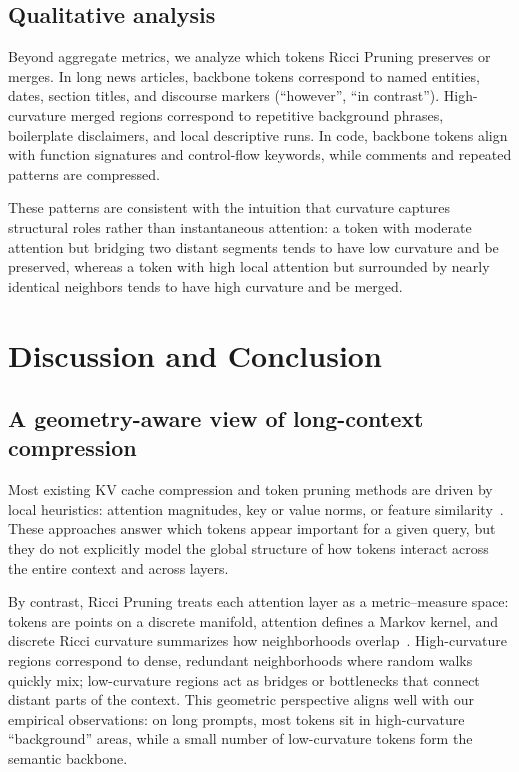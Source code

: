 \documentclass{article}
\theoremstyle{plain}
\theoremstyle{definition}
\theoremstyle{remark}
\begin{document}
\subsection{Qualitative analysis}

Beyond aggregate metrics, we analyze which tokens Ricci Pruning preserves or merges. In long news articles, backbone tokens correspond to named entities, dates, section titles, and discourse markers (``however'', ``in contrast''). High-curvature merged regions correspond to repetitive background phrases, boilerplate disclaimers, and local descriptive runs. In code, backbone tokens align with function signatures and control-flow keywords, while comments and repeated patterns are compressed.

These patterns are consistent with the intuition that curvature captures structural roles rather than instantaneous attention: a token with moderate attention but bridging two distant segments tends to have low curvature and be preserved, whereas a token with high local attention but surrounded by nearly identical neighbors tends to have high curvature and be merged.

\section{Discussion and Conclusion}
\label{sec:discussion-conclusion}

\subsection{A geometry-aware view of long-context compression}

Most existing KV cache compression and token pruning methods are driven by local heuristics: attention magnitudes, key or value norms, or feature similarity~\citep{ge2024fastgen,liu2024minicache,li2024snapkv,hooper2024kvquant,devoto2024l2kv,bolya2023tome}. These approaches answer which tokens appear important for a given query, but they do not explicitly model the global structure of how tokens interact across the entire context and across layers.

By contrast, Ricci Pruning treats each attention layer as a metric--measure space: tokens are points on a discrete manifold, attention defines a Markov kernel, and discrete Ricci curvature summarizes how neighborhoods overlap~\citep{ollivier2009ricci,ni2019community,sia2019ollivier,yadav2025roadmap}. High-curvature regions correspond to dense, redundant neighborhoods where random walks quickly mix; low-curvature regions act as bridges or bottlenecks that connect distant parts of the context. This geometric perspective aligns well with our empirical observations: on long prompts, most tokens sit in high-curvature ``background'' areas, while a small number of low-curvature tokens form the semantic backbone.
\end{document}
